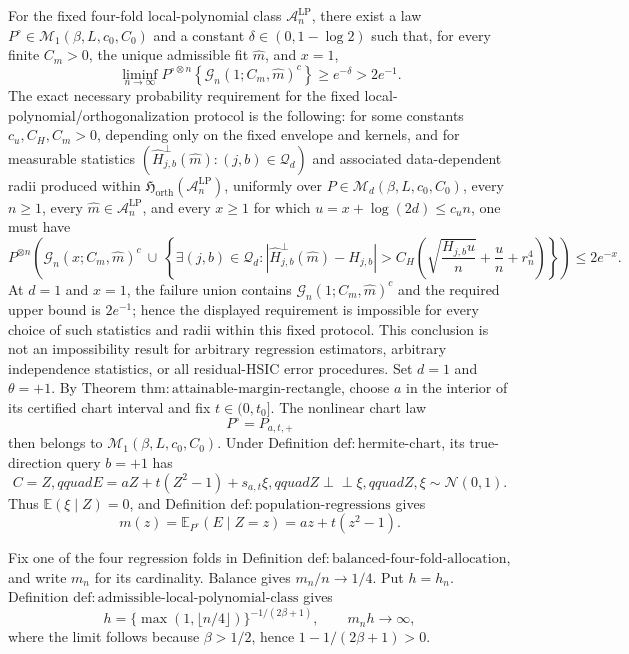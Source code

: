 For the fixed four-fold local-polynomial class \(\mathcal A_n^{\mathrm{LP}}\), there exist a law \(P^\circ\in\mathcal M_1(\beta,L,c_0,C_0)\) and a constant \(\delta\in(0,1-\log 2)\) such that, for every finite \(C_m>0\), the unique admissible fit \(\widehat m\), and \(x=1\),
\[
\liminf_{n\to\infty}P^{\circ\otimes n}\!\left\{\mathcal G_n(1;C_m,\widehat m)^c\right\}\ge e^{-\delta}>2e^{-1}.
\]
The exact necessary probability requirement for the fixed local-polynomial/orthogonalization protocol is the following: for some constants \(c_u,C_H,C_m>0\), depending only on the fixed envelope and kernels, and for measurable statistics \((\widehat H^\perp_{j,b}(\widehat m):(j,b)\in\mathcal Q_d)\) and associated data-dependent radii produced within \(\mathfrak H_{\mathrm{orth}}(\mathcal A_n^{\mathrm{LP}})\), uniformly over \(P\in\mathcal M_d(\beta,L,c_0,C_0)\), every \(n\ge1\), every \(\widehat m\in\mathcal A_n^{\mathrm{LP}}\), and every \(x\ge1\) for which \(u=x+\log(2d)\le c_u n\), one must have
\[
P^{\otimes n}\!\left(
\mathcal G_n(x;C_m,\widehat m)^c
\ \cup\
\left\{\exists(j,b)\in\mathcal Q_d:
\left|\widehat H^\perp_{j,b}(\widehat m)-H_{j,b}\right|
>C_H\left(\sqrt{\frac{H_{j,b}u}{n}}+\frac{u}{n}+r_n^4\right)
\right\}
\right)\le2e^{-x}.
\]
At \(d=1\) and \(x=1\), the failure union contains \(\mathcal G_n(1;C_m,\widehat m)^c\) and the required upper bound is \(2e^{-1}\); hence the displayed requirement is impossible for every choice of such statistics and radii within this fixed protocol. This conclusion is not an impossibility result for arbitrary regression estimators, arbitrary independence statistics, or all residual-HSIC error procedures.
Set \(d=1\) and \(\theta=+1\). By Theorem \(\mathrm{thm:attainable\text{-}margin\text{-}rectangle}\), choose \(a\) in the interior of its certified chart interval and fix \(t\in(0,t_0]\). The nonlinear chart law
\[
P^\circ=P_{a,t,+}
\]
then belongs to \(\mathcal M_1(\beta,L,c_0,C_0)\). Under Definition \(\mathrm{def:hermite\text{-}chart}\), its true-direction query \(b=+1\) has
\[
C=Z,qquad E=aZ+t(Z^2-1)+s_{a,t}\xi,qquad
Z\mathrel{\perp\!\!\!\perp}\xi,qquad Z,\xi\sim\mathcal N(0,1).
\]
Thus \(\mathbb E(\xi\mid Z)=0\), and Definition \(\mathrm{def:population\text{-}regressions}\) gives
\[
m(z)=\mathbb E_{P^\circ}(E\mid Z=z)=az+t(z^2-1).
\]

Fix one of the four regression folds in Definition \(\mathrm{def:balanced\text{-}four\text{-}fold\text{-}allocation}\), and write \(m_n\) for its cardinality. Balance gives \(m_n/n\to1/4\). Put \(h=h_n\). Definition \(\mathrm{def:admissible\text{-}local\text{-}polynomial\text{-}class}\) gives
\[
h=\{\max(1,\lfloor n/4\rfloor)\}^{-1/(2\beta+1)},
\qquad m_nh\longrightarrow\infty,
\]
where the limit follows because \(\beta>1/2\), hence \(1-1/(2\beta+1)>0\).

